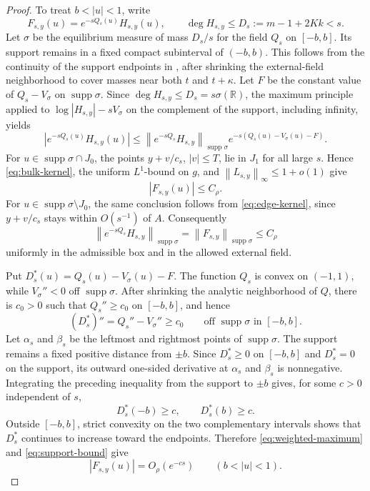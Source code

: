 \documentclass[11pt]{article}
\theoremstyle{definition}
\numberwithin{equation}{section}
\DeclareMathOperator{\supp}{supp}
\newcommand{\R}{\mathbb R}
\newcommand{\norm}[1]{\left\lVert #1\right\rVert}
\begin{document}
\begin{proof}
To treat \(b<|u|<1\), write
\[
 F_{s,y}(u)=e^{-sQ_s(u)}H_{s,y}(u),
 \qquad
 \deg H_{s,y}\le D_s:=m-1+2Kk<s.
\]
Let \(\sigma\) be the equilibrium measure of mass \(D_s/s\)
for the field \(Q_s\) on \([-b,b]\).
Its support remains in a fixed compact subinterval of \((-b,b)\).
This follows from the continuity of the support endpoints in
\cite[Lemma 2.4]{KSSV}, after shrinking the external-field
neighborhood to cover masses near both \(t\) and \(t+\kappa\).
Let \(F\) be the constant value of \(Q_s-V_\sigma\) on
\(\supp\sigma\). Since \(\deg H_{s,y}\le D_s=s\sigma(\R)\), the
maximum principle applied to \(\log|H_{s,y}|-sV_\sigma\) on the
complement of the support, including infinity, yields
\begin{equation}\label{eq:weighted-maximum}
 |e^{-sQ_s(u)}H_{s,y}(u)|
 \le \norm{e^{-sQ_s}H_{s,y}}_{\supp\sigma}
 e^{-s(Q_s(u)-V_\sigma(u)-F)}.
\end{equation}
For \(u\in\supp\sigma\cap J_0\), the points
\(y+v/c_s\), \(|v|\le T\), lie in \(J_1\) for all large \(s\).
Hence \eqref{eq:bulk-kernel}, the uniform \(L^1\)-bound on \(g\),
and \(\norm{L_{s,y}}_\infty\le1+o(1)\) give
\[
 |F_{s,y}(u)|\le C_\rho.
\]
For \(u\in\supp\sigma\setminus J_0\), the same conclusion follows
from \eqref{eq:edge-kernel}, since \(y+v/c_s\) stays within
\(O(s^{-1})\) of \(A\). Consequently
\begin{equation}\label{eq:support-bound}
 \norm{e^{-sQ_s}H_{s,y}}_{\supp\sigma}
 =\norm{F_{s,y}}_{\supp\sigma}\le C_\rho
\end{equation}
uniformly in the admissible box and in the allowed external field.

Put \(D_s^*(u)=Q_s(u)-V_\sigma(u)-F\). The function \(Q_s\) is
convex on \((-1,1)\), while \(V_\sigma''<0\) off \(\supp\sigma\).
After shrinking the analytic neighborhood of \(Q\), there is
\(c_0>0\) such that \(Q_s''\ge c_0\) on \([-b,b]\), and hence
\[
 (D_s^*)''=Q_s''-V_\sigma''\ge c_0
 \qquad\text{off }\supp\sigma\text{ in }[-b,b].
\]
Let \(\alpha_s\) and \(\beta_s\) be the leftmost and rightmost points
of \(\supp\sigma\). The support remains a fixed positive distance
from \(\pm b\). Since \(D_s^*\ge0\) on \([-b,b]\) and \(D_s^*=0\) on the support,
its outward one-sided derivative at \(\alpha_s\) and \(\beta_s\) is
nonnegative. Integrating the preceding inequality from the support
to \(\pm b\) gives, for some \(c>0\) independent of \(s\),
\[
 D_s^*(-b)\ge c,\qquad D_s^*(b)\ge c.
\]
Outside \([-b,b]\), strict convexity on the two complementary
intervals shows that \(D_s^*\) continues to increase toward the
endpoints. Therefore \eqref{eq:weighted-maximum} and
\eqref{eq:support-bound} give
\begin{equation}\label{eq:weighted-exterior}
 |F_{s,y}(u)|=O_\rho(e^{-cs})
 \qquad(b<|u|<1).
\end{equation}


\end{proof}
\end{document}
